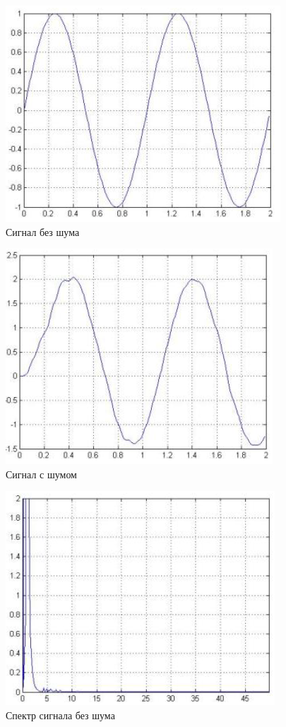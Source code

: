 \begin{figure}[H]
   \includegraphics[scale=0.7]{lab6/1.png}
   \caption{Сигнал без шума}
\end{figure}

\begin{figure}[H]
   \includegraphics[scale=0.7]{lab6/2.png}
   \caption{Сигнал с шумом}
\end{figure}

\begin{figure}[H]
   \includegraphics[scale=0.7]{lab6/3.png}
   \caption{Спектр сигнала без шума}
\end{figure}

